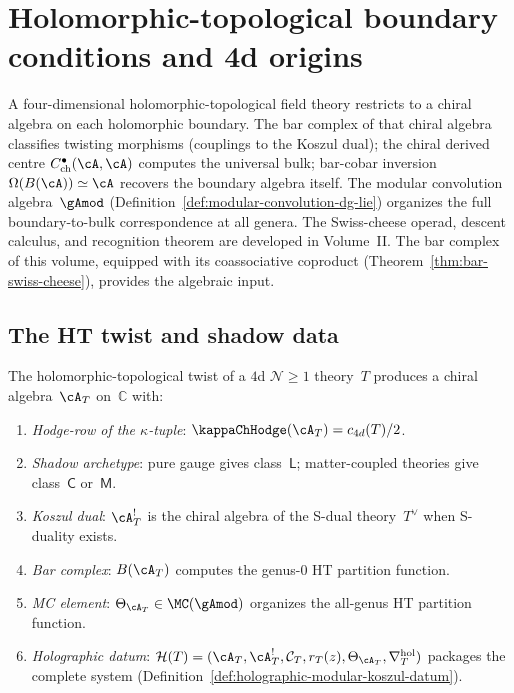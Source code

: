 \chapter{Holomorphic-topological boundary conditions and 4d origins}
\label{ch:ht-boundary}


A four-dimensional holomorphic-topological field theory restricts to a
chiral algebra on each holomorphic boundary. The bar complex of that
chiral algebra classifies twisting morphisms (couplings to the
Koszul dual); the chiral derived centre
$C^\bullet_{\mathrm{ch}}(\cA,\cA)$ computes the universal
bulk; bar-cobar inversion $\Omega(B(\cA)) \simeq \cA$
recovers the boundary algebra itself. The modular
convolution algebra~$\gAmod$
(Definition~\ref{def:modular-convolution-dg-lie}) organizes the full boundary-to-bulk correspondence
at all genera. The Swiss-cheese operad, descent
calculus, and recognition theorem are developed in Volume~II\@. The bar complex of
this volume, equipped with its coassociative coproduct
(Theorem~\ref{thm:bar-swiss-cheese}), provides the algebraic input.

\section{The HT twist and shadow data}
\label{sec:ht-shadow-data}

\begin{construction}
\label{constr:ht-shadow-data}
The holomorphic-topological twist of a $4$d $\mathcal{N} \geq 1$
theory~$T$ produces a chiral algebra~$\cA_T$ on~$\mathbb{C}$ with:
\begin{enumerate}[label=\textup{(\roman*)}]
\item \emph{Hodge-row of the $\kappa$-tuple}:
 $\kappaChHodge(\cA_T) = c_{4d}(T)/2$.
\item \emph{Shadow archetype}: pure gauge gives
 class~$\mathsf{L}$; matter-coupled theories give
 class~$\mathsf{C}$ or~$\mathsf{M}$.
\item \emph{Koszul dual}: $\cA_T^!$ is the chiral algebra of the
 S-dual theory~$T^\vee$ when S-duality exists.
\item \emph{Bar complex}: $B(\cA_T)$ computes the genus-$0$ HT
 partition function.
\item \emph{MC element}:
 $\Theta_{\cA_T} \in \MC(\gAmod)$ organizes the all-genus
 HT partition function.
\item \emph{Holographic datum}:
 $\mathcal{H}(T) = (\cA_T, \cA_T^!, \mathcal{C}_T, r_T(z),
 \Theta_{\cA_T}, \nabla^{\mathrm{hol}}_T)$ packages the complete
 system
 \textup{(}Definition~\textup{\ref{def:holographic-modular-koszul-datum}}\textup{)}.
\end{enumerate}
\end{construction}


